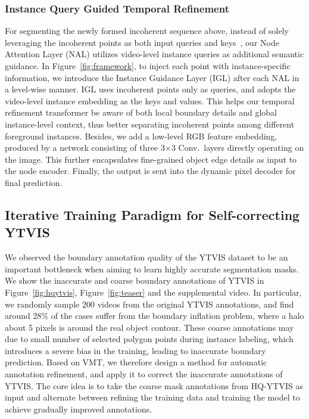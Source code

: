 \documentclass[runningheads]{llncs}
\begin{document}
\subsubsection{Instance Query Guided Temporal Refinement}


For segmenting the newly formed incoherent sequence above, instead of solely leveraging the incoherent points as both input queries and keys~\cite{transfiner}, our Node Attention Layer (NAL) utilizes video-level instance queries as additional semantic guidance. In Figure~\ref{fig:framework}, to inject each point with instance-specific information, we introduce the Instance Guidance Layer (IGL) after each NAL in a level-wise manner. IGL uses incoherent points only as queries, and adopts the video-level instance embedding as the keys and values. This helps our temporal refinement transformer be aware of both
local boundary details and global instance-level context, thus better separating incoherent points among different foreground instances. 
Besides, we add a low-level RGB feature embedding, produced by a network consisting of three 3$\times$3 Conv.\ layers directly operating on the image. This further encapsulates fine-grained object edge details as input to the node encoder. 
Finally, the output is sent into the dynamic pixel decoder for final prediction. 

\subsection{Iterative Training Paradigm for Self-correcting YTVIS}
\label{sec:loop}

We observed the boundary annotation quality of the YTVIS dataset to be an important bottleneck when aiming to learn highly accurate segmentation masks. 
We show the inaccurate and coarse boundary annotations of YTVIS in Figure~\ref{fig:hqytvis}, Figure~\ref{fig:teaser} and the supplemental video. In particular, we randomly sample 200 videos from the original YTVIS annotations, and find around 28\% of the cases suffer from the boundary inflation problem, where a halo about 5 pixels is around the real object contour. These coarse annotations may due to small number of selected polygon points during instance labeling, which introduces a severe bias in the training, leading to inaccurate boundary prediction.
Based on VMT, we therefore design a method for automatic annotation refinement, and apply it to correct the inaccurate annotations of YTVIS. The core idea is to take the coarse mask annotations from HQ-YTVIS as input and alternate between refining the training data and training the model to achieve gradually improved annotations. 
\end{document}
